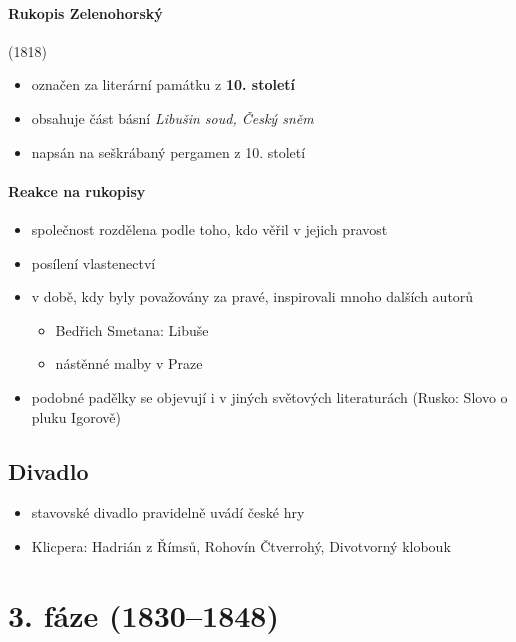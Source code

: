 \paragraph{Rukopis Zelenohorský} (1818)
\begin{itemize}
\item označen za literární památku z \textbf{10. století}
\item obsahuje část básní \textit{Libušin soud, Český sněm}
\item napsán na seškrábaný pergamen z 10. století
\end{itemize}

\paragraph{Reakce na rukopisy}
\begin{itemize}
\item společnost rozdělena podle toho, kdo věřil v jejich pravost
\item posílení vlastenectví
\item v době, kdy byly považovány za pravé, inspirovali mnoho dalších autorů
	\begin{itemize}
	\item Bedřich Smetana: Libuše
	\item nástěnné malby v Praze
	\end{itemize}
\item podobné padělky se objevují i v jiných světových literaturách (Rusko: Slovo o pluku Igorově)
\end{itemize}

\subsection{Divadlo}
\begin{itemize}
\item stavovské divadlo pravidelně uvádí české hry
\item Klicpera: Hadrián z Římsů, Rohovín Čtverrohý, Divotvorný klobouk
\end{itemize}



\newpage
\section{3. fáze (1830--1848)}
